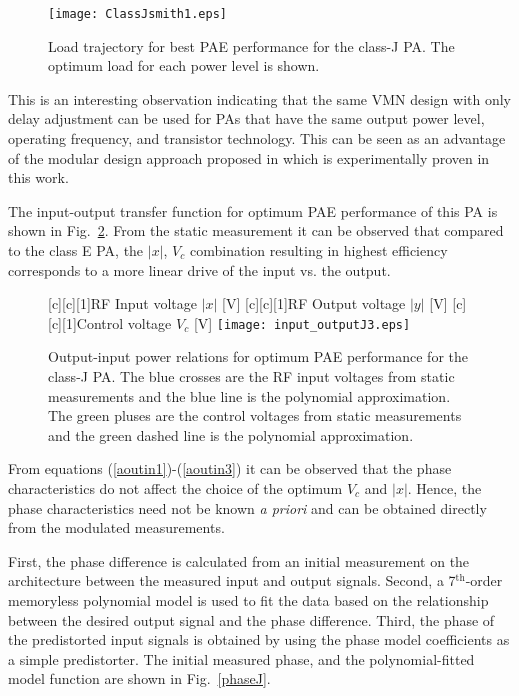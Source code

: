 \documentclass[10pt,journal]{IEEEtran}
\begin{document}
\begin{figure}
\centering
\texttt{[image: ClassJsmith1.eps]}
\caption{Load trajectory for best PAE performance for the class-J PA. The optimum load for each power level is shown.}
\label{classJsmith}
\end{figure}

This is an interesting observation indicating that the same VMN design with only delay adjustment can be used for PAs that have the same output power level, operating frequency, and transistor technology. This can be seen as an advantage of the modular design approach proposed in \cite{hosseinMTT} which is experimentally proven in this work.

The input-output transfer function for optimum PAE performance of this PA is shown in Fig.~\ref{out-inJ}. From the static measurement it can be observed that compared to the class E PA, the $|x|$, $V_c$ combination resulting in highest efficiency corresponds to a more linear drive of the input vs. the output.

\begin{figure}
\centering
{}[c][c][1]{RF Input voltage $|x|$ [V]} [c][c][1]{RF Output voltage $|y|$ [V]} [c][c][1]{Control voltage $V_c$ [V]}
\texttt{[image: input\_outputJ3.eps]}
\caption{Output-input power relations for optimum PAE performance for the class-J PA. The blue crosses are the RF input voltages from static measurements and the blue line is the polynomial approximation. The green pluses are the control voltages from static measurements and the green dashed line is the polynomial approximation.}
\label{out-inJ}
\end{figure}

From equations (\ref{aoutin1})-(\ref{aoutin3}) it can be observed that the phase characteristics do not affect the choice of the optimum $V_c$ and $|x|$. Hence, the phase characteristics need not be known \emph{a priori} and can be obtained directly from the modulated measurements.

First, the phase difference is calculated from an initial measurement on the architecture between the measured input and output signals. Second, a 7$^{\text{th}}$-order memoryless polynomial model is used to fit the data based on the relationship between the desired output signal and the phase difference. Third, the phase of the predistorted input signals is obtained by using the phase model coefficients as a simple predistorter. The initial measured phase, and the polynomial-fitted model function are shown in Fig.~\ref{phaseJ}.
\end{document}
